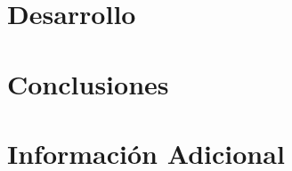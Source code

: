 \documentclass[final]{udpthesis}
\begin{document}
\part{Desarrollo}


\part{Conclusiones}


\part{Información Adicional}
\backmatter








\appendix



% 
\end{document}
